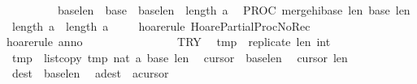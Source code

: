 \begin{isabellebody}
\ \ \ \ \ \ \ \ \ \ {\isacharparenleft}{\isasymacute}base{}{\isacharplus}{\isasymacute}len{}\ {\isacharequal}\ {\isasymacute}base{}{\isacharparenright}\ {\isasymand}\ {\isacharparenleft}{\isasymacute}base{}{\isacharplus}{\isasymacute}len{}\ {\isasymle}\ length\ {\isasymacute}a{\isacharparenright}{\isasymrbrace}\isanewline
\ \ PROC\ merge{\isacharunderscore}hi{\isacharparenleft}{\isasymacute}base{}{\isacharcomma}\ {\isasymacute}len{}{\isacharcomma}\ {\isasymacute}base{}{\isacharcomma}\ {\isasymacute}len{}{\isacharparenright}\isanewline
\ \ {\isasymlbrace}length\ {\isasymacute}a\ {\isacharequal}\ length\ \isactrlbsup {\isasymsigma}\isactrlesup a\ {\isasymrbrace}{\isachardoublequoteclose}\isanewline
%
\isadelimproof
\ \ %
\endisadelimproof
%
\isatagproof
{}\isamarkupfalse%
\ {\isacharparenleft}hoare{\isacharunderscore}rule\ HoarePartial{\isachardot}ProcNoRec{}{\isacharparenright}\isanewline
\ \ \isamarkupfalse%
\ {\isacharparenleft}hoare{\isacharunderscore}rule\ anno{\isacharequal}{\isachardoublequoteopen}\isanewline
\ \ \ \ \ \ \ \ \ \ \ \ \ \ \ \ TRY\isanewline
\ \ {\isasymacute}tmp\ {\isacharcolon}{\isacharequal}{\isacharequal}\ replicate\ {\isasymacute}len{}\ {\isacharparenleft}{}{\isacharcolon}{\isacharcolon}int{\isacharparenright}{\isacharsemicolon}{\isacharsemicolon}\isanewline
\ \ {\isasymacute}tmp\ {\isacharcolon}{\isacharequal}{\isacharequal}\ list{\isacharunderscore}copy\ {\isasymacute}tmp\ {\isacharparenleft}{}{\isacharcolon}{\isacharcolon}nat{\isacharparenright}\ {\isasymacute}a\ {\isasymacute}base{}\ {\isasymacute}len{}{\isacharsemicolon}{\isacharsemicolon}\isanewline
\ \ {\isasymacute}cursor{}\ {\isacharcolon}{\isacharequal}{\isacharequal}\ {\isasymacute}base{}{\isacharplus}{\isasymacute}len{}{\isacharminus}{}{\isacharsemicolon}{\isacharsemicolon}\isanewline
\ \ {\isasymacute}cursor{}\ {\isacharcolon}{\isacharequal}{\isacharequal}{\isasymacute}len{}{\isacharminus}{}{\isacharsemicolon}{\isacharsemicolon}\isanewline
\ \ {\isasymacute}dest\ {\isacharcolon}{\isacharequal}{\isacharequal}\ {\isasymacute}base{}{\isacharplus}{\isasymacute}len{}{\isacharminus}{}{\isacharsemicolon}{\isacharsemicolon}\isanewline
\ \ {\isasymacute}a{\isacharbang}{\isasymacute}dest\ {\isacharcolon}{\isacharequal}{\isacharequal}\ {\isasymacute}a{\isacharbang}{\isasymacute}cursor{}{\isacharsemicolon}{\isacharsemicolon}\isanewline

\end{isabellebody}
